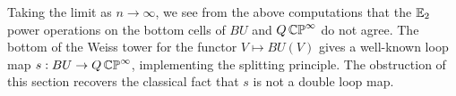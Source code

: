 \begin{rmk}
Taking the limit as $n\to\infty$, we see from the above computations that the $\operatorname{\mathbb{E}}_2$ power operations on the bottom cells of $BU$ and $Q\operatorname{\mathbb{CP}}^{\infty}$ do not agree.  The bottom of the Weiss tower for the functor $V \mapsto BU(V)$ gives a well-known loop map $s:BU \to Q\operatorname{\mathbb{CP}}^{\infty}$, implementing the splitting principle.  The obstruction of this section recovers the classical fact that $s$ is not a double loop map.
\end{rmk}

